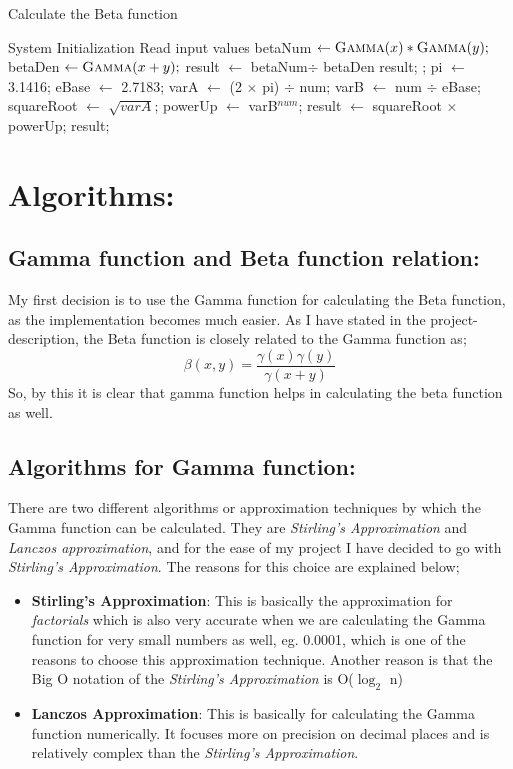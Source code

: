 \documentclass[10pt]{article}
\begin{document}
\begin{algorithm}
\caption{Calculate the Beta function}
\begin{algorithmic}[1]

    \State System Initialization
    \State Read input values
    \State betaNum $\gets \textsc{Gamma}(x) * \textsc{Gamma}(y);$
    \State betaDen $\gets \textsc{Gamma}(x+y);$
    \State result $\gets$ betaNum$\div$ betaDen 
    \State \Return result;
    \Else
    \State \Return;
    \EndIf
\EndProcedure
\State
{}
    \State pi $\gets$ 3.1416; 
    \State eBase $\gets$ 2.7183; 
    \State varA $\gets$ (2 $\times$ pi) $\div$ num;
    \State varB $\gets$ num $\div$ eBase;
    \State squareRoot $\gets$ $\sqrt{varA}$;
    \State powerUp $\gets$ varB$^{num}$;
    \State result $\gets$ squareRoot $\times$ powerUp;
    \State \Return result;
\EndProcedure
\end{algorithmic}
\end{algorithm}

\section*{Algorithms:}
\subsection*{Gamma function and Beta function relation:}
My first decision is to use the Gamma function for calculating the Beta function, as the implementation becomes much easier. As I have stated in the project-description, the Beta function is closely related to the Gamma function as;
$$\beta(x,y) = \frac{\gamma(x)\gamma(y)}{\gamma(x+y)}$$
So, by this it is clear that gamma function helps in calculating the beta function as well.
\subsection*{Algorithms for Gamma function:}
There are two different algorithms or approximation techniques by which the Gamma function can be calculated. They are \textit{Stirling's Approximation} and \textit{Lanczos approximation}, and for the ease of my project I have decided to go with \textit{Stirling's Approximation}. The reasons for this choice are explained below;
\begin{itemize}
    \item \textbf{Stirling's Approximation}: This is basically the approximation for \textit{factorials} which is also very accurate when we are calculating the Gamma function for very small numbers as well, eg. 0.0001, which is one of the reasons to choose this approximation technique. Another reason is that the Big O notation of the  \textit{Stirling's Approximation} is O($\log_2$ n)
    
    \item \textbf{Lanczos Approximation}: This is basically for calculating the Gamma function numerically. It focuses more on precision on decimal places and is relatively complex than the \textit{Stirling's Approximation}.
\end{itemize}
\end{document}
